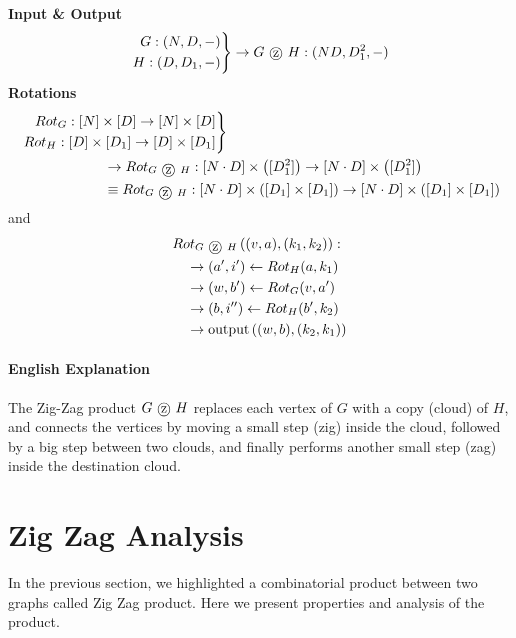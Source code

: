 \begin{definition}
	\label{def:zig zag product}
	\textbf{Input \& Output}
	\begin{equation}
		\left. \begin{aligned}
 			G: (N, D, -) \\
 			H: (D, D_1, -) 
 		\end{aligned}\right\rbrace \rightarrow G \tcircle{z} H : (ND, D_1^2, -)
	\end{equation}
	\textbf{Rotations}
	\begin{align}
		&\left. \begin{aligned}
 			Rot_G: [N] \times [D] \rightarrow [N] \times [D] \\
 			Rot_H: [D] \times [D_1] \rightarrow [D] \times [D_1]
 		\end{aligned}\right \rbrace 
 		\\
 		&\quad \quad \quad \quad \quad \quad
 		\rightarrow Rot_{G\tcircle{z} H}: [N\cdot D] \times \left( [D_1^2] \right) \rightarrow [N\cdot D] \times \left( [D_1^2] \right)
 		\\
 		&\quad \quad \quad \quad \quad \quad
 		\equiv Rot_{G\tcircle{z} H}: [N\cdot D] \times \left( [D_1] \times [D_1] \right) \rightarrow [N\cdot D] \times \left( [D_1] \times [D_1] \right)
	\end{align}
	and 
	\begin{align}
		&Rot_{G \tcircle {z}  H} \left ( (v, a) , (k_1, k_2) \right) : \\
		&\quad \rightarrow (a', i') \gets Rot_H(a, k_1) \\
		&\quad \rightarrow (w, b') \gets Rot_G (v, a') \\
		&\quad \rightarrow (b, i'') \gets Rot_H (b', k_2) \\
		&\quad \rightarrow \text{output} \left( (w, b), (k_2, k_1) \right)
	\end{align}
	\paragraph{English Explanation} The Zig-Zag product $G \tcircle{z} H$ replaces each vertex of $G$ with a copy (cloud) of $H$, and connects the vertices by moving a small step (zig) inside the cloud, followed by a big step between two clouds, and finally performs another small step (zag) inside the destination cloud. 
\end{definition}

\section{Zig Zag Analysis}
In the previous section, we highlighted a combinatorial product between two graphs called Zig Zag product. Here we present properties and analysis of the product. 

